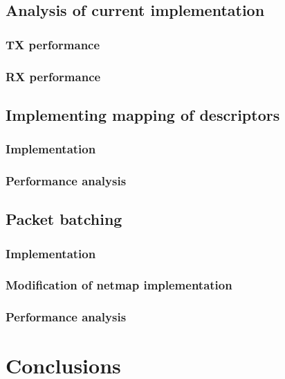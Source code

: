 \documentclass[a4paper, 12pt, titlepage]{report}
\begin{document}
\section{Analysis of current implementation}
\subsection{TX performance}
\subsection{RX performance}
\section{Implementing mapping of descriptors} \label{subsec:memmap}
\subsection{Implementation}
\subsection{Performance analysis}
\section{Packet batching}
\subsection{Implementation}
\subsection{Modification of netmap implementation}
\subsection{Performance analysis}
\chapter{Conclusions}
\end{document}
